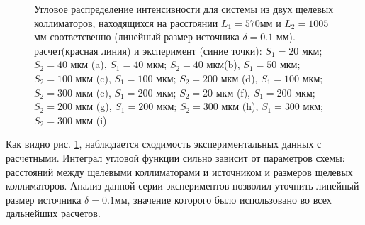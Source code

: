 \begin{figure}[H]
  \hfill
  \hfill
  \hfill
  \caption{Угловое распределение интенсивности для системы из двух щелевых коллиматоров, находящихся
  на расстоянии $L_1= 570 $мм и $L_2 = 1005$ мм соответсвенно (линейный размер источника $\delta = 0.1$ мм).
  расчет(красная линия) и эксперимент (синие точки):
  $S_1 = 20$ мкм; $S_2 = 40$ мкм (a),
  $S_1 = 40$ мкм; $S_2 = 40$ мкм(b), $S_1 = 50$ мкм; $S_2 = 100$ мкм (c),
   $S_1 = 100$ мкм; $S_2 = 200$ мкм (d),  $S_1 = 100$ мкм; $S_2 = 300$ мкм (e),
    $S_1 = 200$ мкм; $S_2 = 20$ мкм (f),  $S_1 = 200$ мкм; $S_2 = 200$ мкм (g),
    $S_1 = 200$ мкм; $S_2 = 300$ мкм (h),  $S_1 = 300$ мкм; $S_2 = 300$ мкм (i)}
  \label{ris:zero_exp}
\end{figure}

Как видно рис. \ref{ris:zero_exp}, наблюдается сходимость экспериментальных данных с расчетными.
Интеграл угловой функции сильно зависит от параметров схемы: расстояний между щелевыми коллиматорами и источником и
размеров щелевых коллиматоров. Анализ данной серии экспериментов позволил уточнить линейный размер источника $\delta = 0.1$мм,
значение которого было использовано во всех дальнейших расчетов.
